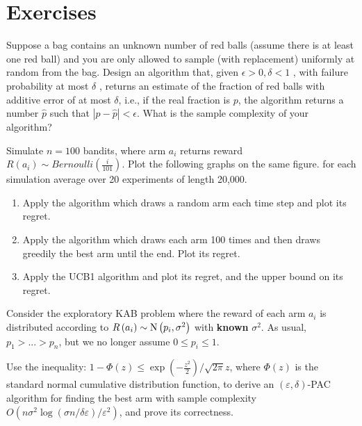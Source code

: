 \section{Exercises}

\begin{exercise}
Suppose a bag contains an unknown number of red balls (assume there is at least one red ball) and you are only allowed to sample (with replacement) uniformly at random from the bag. Design an algorithm that, given $\epsilon>0, \delta<1$ , with failure probability at most $\delta $ , returns an estimate of the fraction of red balls with additive error of at most $\delta$, i.e., if the real fraction is $p$, the algorithm returns a number $\hat p$ such that $|p - \hat{p}|<\epsilon$.
What is the sample complexity of your algorithm?
\end{exercise}

\begin{exercise}
Simulate $n=100$ bandits, where arm ${a_i}$ returns reward $R\left( {{a_i}} \right)\sim Bernoulli\left( {\frac{i}{{101}}} \right)$. Plot the following graphs on the same figure. for each simulation average over 20 experiments of length 20,000.
\begin{enumerate}
  \item Apply the algorithm which draws a random arm each time step and plot its regret.
  \item Apply the algorithm which draws each arm 100 times and then draws greedily the best arm until the end. Plot its regret.
  \item Apply the UCB1 algorithm and plot its regret, and the upper bound on its regret.
\end{enumerate}
\end{exercise}

\begin{exercise}
Consider the exploratory KAB problem where the reward of each arm ${a_i}$ is distributed according to $R\left( {{a_i}} \right)\sim {\rm N}\left( {{p_i},{\sigma ^2}} \right)$ with \textbf{known} ${\sigma ^2}$. As usual, ${p_1} > ... > {p_n}$, but we no longer assume $0 \le {p_i} \le 1$.

Use the inequality: $1 - \Phi \left( z \right) \le \exp \left( { - \frac{{{z^2}}}{2}} \right)/\sqrt {2\pi } z$, where $\Phi \left( z \right)$ is the standard normal cumulative distribution function, to derive an $\left( {\varepsilon ,\delta } \right)$-PAC algorithm for finding the best arm with sample complexity $O\left( {n{\sigma ^2}\log \left( {\sigma n/\delta \varepsilon } \right)/{\varepsilon ^2}} \right)$, and prove its correctness.
\end{exercise}

